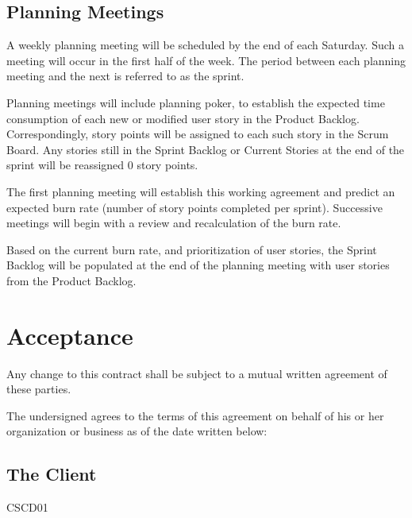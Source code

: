 \documentclass[a4paper,12pt]{article} %
\newcommand{\ClientName}{CSCD01}
\begin{document}
\subsection{Planning Meetings}
A weekly planning meeting will be scheduled by the end of each Saturday. Such a meeting will occur in the first half of the week. The period between each planning meeting and the next is referred to as the sprint.

Planning meetings will include planning poker, to establish the expected time consumption of each new or modified user story in the Product Backlog. Correspondingly, story points will be assigned to each such story in the Scrum Board. Any stories still in the Sprint Backlog or Current Stories at the end of the sprint will be reassigned 0 story points.

The first planning meeting will establish this working agreement and predict an expected burn rate (number of story points completed per sprint). Successive meetings will begin with a review and recalculation of the burn rate.

Based on the current burn rate, and prioritization of user stories, the Sprint Backlog will be populated at the end of the planning meeting with user stories from the Product Backlog.



\newpage %

\section{Acceptance}

Any change to this contract shall be subject to a mutual written agreement of these parties.

The undersigned agrees to the terms of this agreement on behalf of his or her organization or business as of the date written below:


\subsection*{The Client} %

\ClientName \\
\end{document}
